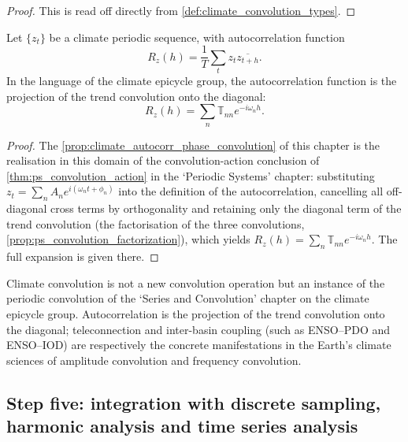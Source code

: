 \begin{proof}
This is read off directly from \cref{def:climate_convolution_types}.
\end{proof}

\begin{proposition}\label{prop:climate_autocorr_phase_convolution}
Let $\{z_t\}$ be a climate periodic sequence, with autocorrelation function
\[
R_z(h)=\frac1T\sum_t z_t\overline{z_{t+h}}.
\]
In the language of the climate epicycle group, the autocorrelation function is the projection of the trend convolution onto the diagonal:
\[
R_z(h)=\sum_n\mathbb T_{nn}e^{-i\omega_n h}.
\]
\end{proposition}

\begin{proof}
The \cref{prop:climate_autocorr_phase_convolution} of this chapter is the realisation in this domain of the convolution-action conclusion of \cref{thm:ps_convolution_action} in the `Periodic Systems' chapter:
substituting $z_t=\sum_n A_n e^{i(\omega_n t+\phi_n)}$ into the definition of the autocorrelation, cancelling all off-diagonal cross terms by orthogonality and retaining only the diagonal term of the trend convolution
(the factorisation of the three convolutions, \cref{prop:ps_convolution_factorization}), which yields $R_z(h)=\sum_n\mathbb T_{nn}e^{-i\omega_n h}$.
The full expansion is given there.
\end{proof}

\begin{remark}\label{rem:climate_convolution_relation}
Climate convolution is not a new convolution operation but an instance of the periodic convolution of the `Series and Convolution' chapter on the climate epicycle group. Autocorrelation is the projection of the trend convolution onto the diagonal; teleconnection and inter-basin coupling (such as ENSO--PDO and ENSO--IOD) are respectively the concrete manifestations in the Earth's climate sciences of amplitude convolution and frequency convolution.
\end{remark}

\subsection{Step five: integration with discrete sampling, harmonic analysis and time series analysis}

